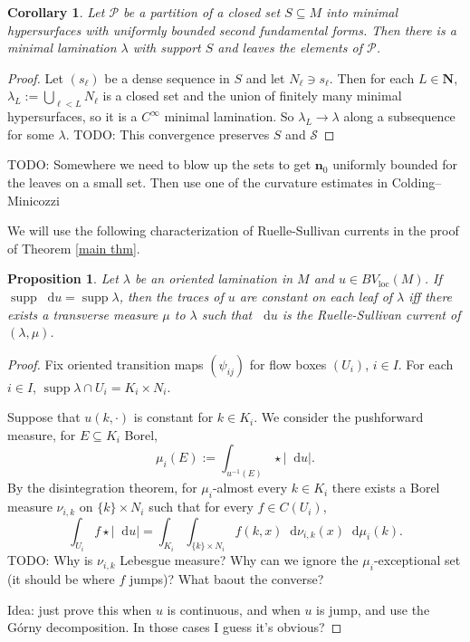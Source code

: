 \documentclass[reqno,10pt]{amsart}
\newcommand{\NN}{\mathbf{N}}
\DeclareMathOperator{\supp}{supp}
\newcommand*\dif{\mathop{}\!\mathrm{d}}
\newcommand{\normal}{\mathbf n}
\newcommand{\loc}{\mathrm{loc}}
\newtheorem{proposition}[theorem]{Proposition}
\newtheorem{corollary}[theorem]{Corollary}
\theoremstyle{definition}
\numberwithin{equation}{section}
\begin{document}
\begin{corollary}
Let $\mathscr P$ be a partition of a closed set $S \subseteq M$ into minimal hypersurfaces with uniformly bounded second fundamental forms.
Then there is a minimal lamination $\lambda$ with support $S$ and leaves the elements of $\mathscr P$.
\end{corollary}
\begin{proof}
Let $(s_\ell)$ be a dense sequence in $S$ and let $N_\ell \ni s_\ell$.
Then for each $L \in \NN$, $\lambda_L := \bigcup_{\ell < L} N_\ell$ is a closed set and the union of finitely many minimal hypersurfaces, so it is a $C^\infty$ minimal lamination.
So $\lambda_L \to \lambda$ along a subsequence for some $\lambda$.
TODO: This convergence preserves $S$ and $\mathscr S$
\end{proof}

TODO: Somewhere we need to blow up the sets to get $\normal_0$ uniformly bounded for the leaves on a small set.
Then use one of the curvature estimates in Colding--Minicozzi

We will use the following characterization of Ruelle-Sullivan currents in the proof of Theorem \ref{main thm}.

\begin{proposition}
Let $\lambda$ be an oriented lamination in $M$ and $u \in BV_\loc(M)$.
If $\supp \dif u = \supp \lambda$, then the traces of $u$ are constant on each leaf of $\lambda$ iff there exists a transverse measure $\mu$ to $\lambda$ such that $\dif u$ is the Ruelle-Sullivan current of $(\lambda, \mu)$.
\end{proposition}
\begin{proof}
Fix oriented transition maps $(\psi_{ij})$ for flow boxes $(U_i)$, $i \in I$.
For each $i \in I$, $\supp \lambda \cap U_i = K_i \times N_i$.

Suppose that $u(k, \cdot)$ is constant for $k \in K_i$.
We consider the pushforward measure, for $E \subseteq K_i$ Borel,
$$\mu_i(E) := \int_{u^{-1}(E)} \star |\dif u|.$$
By the disintegration theorem, for $\mu_i$-almost every $k \in K_i$ there exists a Borel measure $\nu_{i,k}$ on $\{k\} \times N_i$ such that for every $f \in C(U_i)$,
$$\int_{U_i} f \star |\dif u| = \int_{K_i} \int_{\{k\} \times N_i} f(k, x) \dif \nu_{i,k}(x) \dif \mu_i(k).$$
TODO: Why is $\nu_{i,k}$ Lebesgue measure?
Why can we ignore the $\mu_i$-exceptional set (it should be where $f$ jumps)?
What baout the converse?

Idea: just prove this when $u$ is continuous, and when $u$ is jump, and use the G\'orny decomposition.
In those cases I guess it's obvious?
\end{proof}
\end{document}
